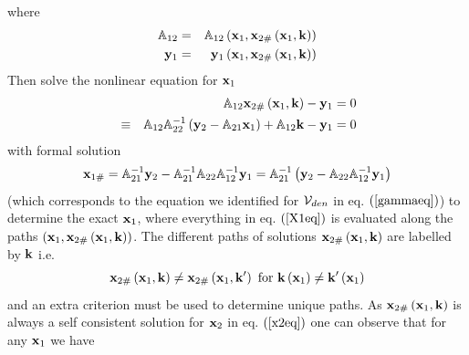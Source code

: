 where 
\begin{eqnarray}
{\Bbb A}_{12} &=&{\Bbb A}_{12}\left( {\bf x}_{1},{\bf x}_{2\#}\left( {\bf x}%
_{1},{\bf k}\right) \right)  \nonumber \\
{\bf y}_{1} &=&{\bf y}_{1}\left( {\bf x}_{1},{\bf x}_{2\#}\left( {\bf x}_{1},%
{\bf k}\right) \right)
\end{eqnarray}%
Then solve the nonlinear equation for ${\bf x}_{1}$ 
\begin{eqnarray}
&&{\Bbb A}_{12}{\bf x}_{2\#}\left( {\bf x}_{1},{\bf k}\right) -{\bf y}_{1}=0
\nonumber \\
&\equiv &{\Bbb A}_{12}{\Bbb A}_{22}^{-1}\left( {\bf y}_{2}-{\Bbb A}_{21}{\bf %
x}_{1}\right) +{\Bbb A}_{12}{\bf k}-{\bf y}_{1}=0  \label{X1eq}
\end{eqnarray}%
with formal solution 
\[
{\bf x}_{1\#}={\Bbb A}_{21}^{-1}{\bf y}_{2}-{\Bbb A}_{21}^{-1}{\Bbb A}_{22}%
{\Bbb A}_{12}^{-1}{\bf y}_{1}={\Bbb A}_{21}^{-1}\left( {\bf y}_{2}-{\Bbb A}%
_{22}{\Bbb A}_{12}^{-1}{\bf y}_{1}\right) 
\]%
(which corresponds to the equation we identified for ${\cal V}_{den}$ in eq. 
$\left( \ref{gammaeq}\right) $) to determine the exact ${\bf x}_{1}$, where
everything in eq. $\left( \ref{X1eq}\right) $ is evaluated along the paths $%
\left( {\bf x}_{1},{\bf x}_{2\#}\left( {\bf x}_{1},{\bf k}\right) \right) $.
The different paths of solutions ${\bf x}_{2\#}\left( {\bf x}_{1},{\bf k}%
\right) $ are labelled by ${\bf k}$ i.e. 
\begin{equation}
{\bf x}_{2\#}\left( {\bf x}_{1},{\bf k}\right) \neq {\bf x}_{2\#}\left( {\bf %
x}_{1},{\bf k}^{\prime }\right) \text{ for }{\bf k}\left( {\bf x}_{1}\right)
\neq {\bf k}^{\prime }\left( {\bf x}_{1}\right)
\end{equation}%
and an extra criterion must be used to determine unique paths. As ${\bf x}%
_{2\#}\left( {\bf x}_{1},{\bf k}\right) $ is always a self consistent
solution for ${\bf x}_{2}$ in eq. $\left( \ref{x2eq}\right) $ one can
observe that for any ${\bf x}_{1}$ we have 
